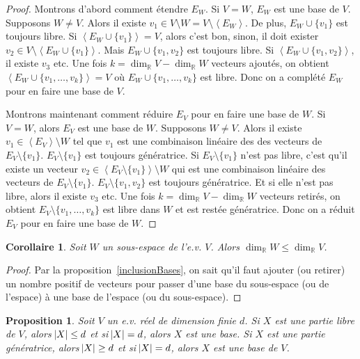 \documentclass{article}
\newcommand{\R}{\mathbb R}
\newcommand{\eng}[1]{\left\langle#1\right\rangle}
\newtheorem{prp}[thm]{Proposition}
\newtheorem{cor}[thm]{Corollaire}
\theoremstyle{definition}
\theoremstyle{remark}
\begin{document}
		\begin{proof} Montrons d'abord comment étendre $E_W$. Si $V=W$, $E_W$ est une base de $V$. Supposons $W \neq V$. Alors il existe $v_1 \in V \setminus W =
		V \setminus \eng {E_W}$. De plus, $E_W \cup \{v_1\}$ est toujours libre. Si $\eng {E_W \cup \{v_1\}} = V$, alors c'est bon, sinon, il doit exister
		$v_2 \in V \setminus \eng {E_W \cup \{v_1\}}$. Mais $E_W \cup \{v_1, v_2\}$ est toujours libre. Si $\eng {E_W \cup \{v_1, v_2\}}$, il existe $v_3$ etc.
		Une fois $k = \dim_\R V - \dim_\R W$ vecteurs ajoutés, on obtient $\eng {E_W \cup \{v_1, \dotsc, v_k\}} = V$ où $E_W \cup \{v_1, \dotsc, v_k\}$ est libre.
		Donc on a complété $E_W$ pour en faire une base de $V$.

		Montrons maintenant comment réduire $E_V$ pour en faire une base de $W$. Si $V=W$, alors $E_V$ est une base de $W$. Supposons $W \neq V$. Alors il existe
		$v_1 \in \eng {E_V} \setminus W$ tel que $v_1$ est une combinaison linéaire des des vecteurs de $E_V \setminus \{v_1\}$. $E_V \setminus \{v_1\}$ est toujours
		génératrice. Si $E_V \setminus \{v_1\}$ n'est pas libre, c'est qu'il existe un vecteur $v_2 \in \eng {E_V \setminus \{v_1\}} \setminus W$ qui est une combinaison
		linéaire des vecteurs de $E_V \setminus \{v_1\}$. $E_V \setminus \{v_1, v_2\}$ est toujours génératrice. Et si elle n'est pas libre, alors il existe $v_3$ etc.
		Une fois $k=\dim_\R V-\dim_\R W$ vecteurs retirés, on obtient $E_V \setminus \{v_1, \dotsc, v_k\}$ est libre dans $W$ et est restée génératrice. Donc on a
		réduit $E_V$ pour en faire une base de $W$. \end{proof}

		\begin{cor} Soit $W$ un sous-espace de l'e.v. $V$. Alors $\dim_\R W \leq \dim_\R V$. \end{cor}

		\begin{proof} Par la proposition~\ref{inclusionBases}, on sait qu'il faut ajouter (ou retirer) un nombre positif de vecteurs pour passer d'une base du
		sous-espace (ou de l'espace) à une base de l'espace (ou du sous-espace). \end{proof}

		\begin{prp} Soit $V$ un e.v. réel de dimension finie $d$. Si $X$ est une partie libre de $V$, alors $\abs X \leq d$ et si $\abs X = d$, alors $X$ est une base.
		Si $X$ est une partie génératrice, alors $\abs X \geq d$ et si $\abs X = d$, alors $X$ est une base de $V$. \end{prp}
\end{document}
